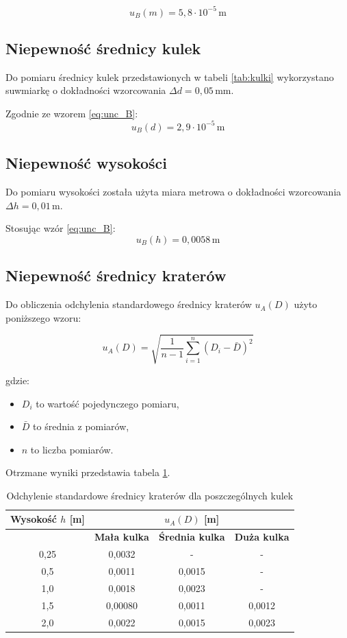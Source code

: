 \documentclass[a4paper,12pt]{article}
\begin{document}
$$
u_B(m) = 5,8 \cdot 10^{-5} \, \text{m}
$$

\subsection{Niepewność średnicy kulek}
Do pomiaru średnicy kulek przedstawionych w tabeli \ref{tab:kulki} wykorzystano suwmiarkę o dokładności wzorcowania $\Delta d = 0,05 \, \text{mm}$. 

Zgodnie ze wzorem \eqref{eq:unc_B}:
\[
u_B(d) = 2,9 \cdot 10^{-5} \, \text{m}
\]

\subsection{Niepewność wysokości}
Do pomiaru wysokości została użyta miara metrowa o dokładności wzorcowania $\Delta h = 0,01 \, \text{m}$. 

Stosując wzór \eqref{eq:unc_B}:
\[
u_B(h) = 0,0058 \, \text{m}
\]

\subsection{Niepewność średnicy kraterów}

Do obliczenia odchylenia standardowego średnicy kraterów $u_A(D)$ użyto poniższego wzoru:

\[
u_A(D) = \sqrt{\frac{1}{n-1} \sum_{i=1}^{n} (D_i - \bar{D})^2}
\]

gdzie:

\begin{itemize}
    \item \( D_i \) to wartość pojedynczego pomiaru,
    \item \( \bar{D} \) to średnia z pomiarów,
    \item \( n \) to liczba pomiarów.
\end{itemize}

Otrzmane wyniki przedstawia tabela \ref{tab:odchylenia_standardowe_srednicy}.

\begin{table}[H]
\centering
\begin{tabular}{|c|c|c|c|}
\hline
\textbf{Wysokość $h$ [m]} & \multicolumn{3}{c|}{\textbf{$u_A(D)$ [m]}} \\
\hline
& \textbf{Mała kulka} & \textbf{Średnia kulka} & \textbf{Duża kulka} \\
\hline
0,25 & 0,0032 & - & - \\
 \hline
 0,5  & 0,0011 & 0,0015 & - \\
 \hline
 1,0  & 0,0018 & 0,0023 & - \\
 \hline
 1,5  & 0,00080 & 0,0011 & 0,0012 \\
 \hline
 2,0  & 0,0022 & 0,0015 & 0,0023 \\
\hline
\end{tabular}
\caption{Odchylenie standardowe średnicy kraterów dla poszczególnych kulek}
\label{tab:odchylenia_standardowe_srednicy}
\end{table}
\end{document}
